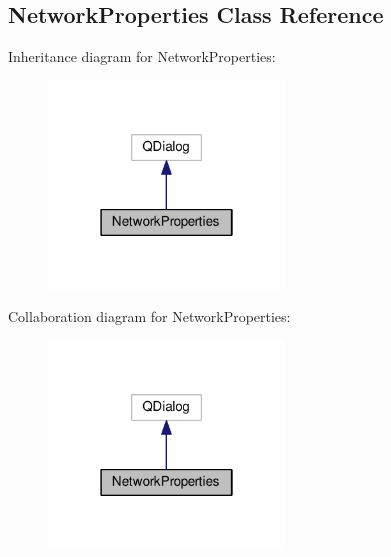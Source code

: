 \hypertarget{class_network_properties}{}\subsection{Network\+Properties Class Reference}
\label{class_network_properties}


Inheritance diagram for Network\+Properties\+:\nopagebreak
\begin{figure}[H]
\begin{center}
\leavevmode
\includegraphics[width=178pt]{class_network_properties__inherit__graph}
\end{center}
\end{figure}


Collaboration diagram for Network\+Properties\+:\nopagebreak
\begin{figure}[H]
\begin{center}
\leavevmode
\includegraphics[width=178pt]{class_network_properties__coll__graph}
\end{center}
\end{figure}
